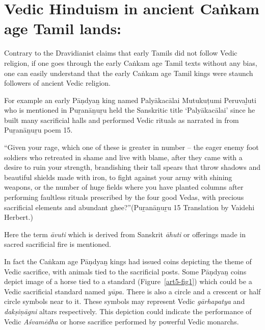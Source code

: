 \section*{Vedic Hinduism in ancient Caṅkam age Tamil lands:}

Contrary to the Dravidianist claims that early Tamils did not follow Vedic religion, if one goes through the early Caṅkam age Tamil texts without any bias, one can easily understand that the early Caṅkam age Tamil kings were staunch followers of ancient Vedic religion.

For example an early Pāṇdyaṉ king named Palyākacālai Mutukuṭumi Peruvaḻuti who is mentioned in Puṟanāṉuṟu held the Sanskritic title ‘Palyākacālai’ since he built many sacrificial halls and performed Vedic rituals as narrated in from Puṟanāṉuṟu poem 15.

\begin{myquote}
“Given your rage, which one of these is greater in number – the eager enemy foot soldiers who retreated in shame and live with blame, after they came with a desire to ruin your strength, brandishing their tall spears that throw shadows and beautiful shields made with iron, to fight against your army with shining weapons, or the number of huge fields where you have planted columns after performing faultless rituals prescribed by the four good Vedas, with precious sacrificial elements and abundant ghee?”\hfill (Puṟanāṉuṟu 15 Translation by Vaidehi Herbert.) 
\end{myquote}

Here the term \textit{āvuti} which is derived from Sanskrit \textit{āhuti} or offerings made in sacred sacrificial fire is mentioned.

\vskip 5pt

In fact the Caṅkam age Pāṇdyaṉ kings had issued coins depicting the theme of Vedic sacrifice, with animals tied to the sacrificial posts. Some Pāṇdyaṉ coins depict image of a horse tied to a standard (Figure~\ref{art5-fig1}) which could be a Vedic sacrificial standard named \textit{yūpa.} There is also a circle and a crescent or half circle symbols near to it. These symbols may represent Vedic \textit{gārhapatya} and \textit{dakṣiṇāgni} altars respectively. This depiction could indicate the performance of Vedic \textit{Aśvamēdha} or horse sacrifice performed by powerful Vedic monarchs.

